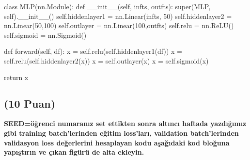 \documentclass[11pt]{article}
\begin{document}
\begin{python}
class MLP(nn.Module):
	def __init__(self, infts, outfts):
		super(MLP, self).__init__()
		self.hiddenlayer1 = nn.Linear(infts, 50)
		self.hiddenlayer2 = nn.Linear(50,100)
		self.outlayer = nn.Linear(100,outfts)
		self.relu = nn.ReLU()
		self.sigmoid = nn.Sigmoid() 

	def forward(self, df):
		x = self.relu(self.hiddenlayer1(df))
		x = self.relu(self.hiddenlayer2(x))
		x = self.outlayer(x)
		x = self.sigmoid(x)

		return x

\end{python}

\subsection{(10 Puan)} \textbf{SEED=öğrenci numaranız set ettikten sonra altıncı haftada yazdığımız gibi training batch'lerinden eğitim loss'ları, validation batch'lerinden validasyon loss değerlerini hesaplayan kodu aşağıdaki kod bloğuna yapıştırın ve çıkan figürü de alta ekleyin.}
\end{document}
